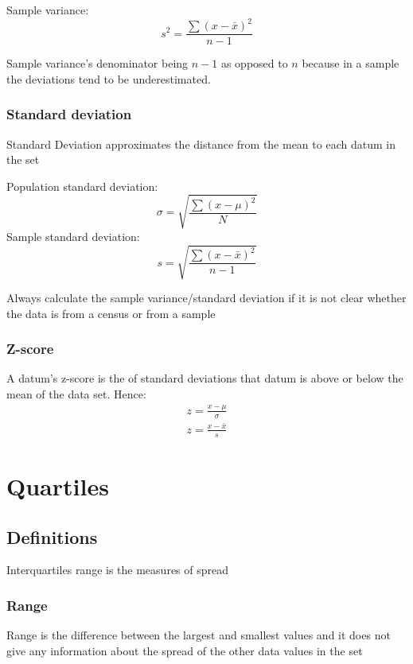Sample variance:
\[
    s^2 = \frac{\sum (x - \bar{x})^2}{n - 1}
\]

Sample variance's denominator being $n-1$ as opposed to $n$ because in a sample the deviations tend to be underestimated.

\subsubsection{Standard deviation}
\begin{definition}
    Standard Deviation approximates the  distance from the mean to each datum in the set
\end{definition}
Population standard deviation:
\begin{equation*}
    \sigma = \sqrt{\frac{\sum (x - \mu)^2}{N}}
\end{equation*}
Sample standard deviation:
\begin{equation*}
    s = \sqrt{\frac{\sum (x - \bar{x})^2}{n - 1}}
\end{equation*}

\begin{remark}
    Always calculate the sample variance/standard deviation if it is not clear whether the data is from a census or from a sample
\end{remark}

\subsubsection{Z-score}
A datum's z-score is the  of standard deviations that datum is above or below the mean of the data set. Hence:\\
\begin{gather*}
    z = \frac{x - \mu}{\sigma}\\
    z = \frac{x - \bar{x}}{s}
\end{gather*}

\section{Quartiles}
\subsection{Definitions}
\begin{definition}
    Interquartiles range is the measures of spread
\end{definition}
\subsubsection{Range}
Range is the difference between the largest and smallest values and it does not give any information about the spread of the other data values
in the set 

